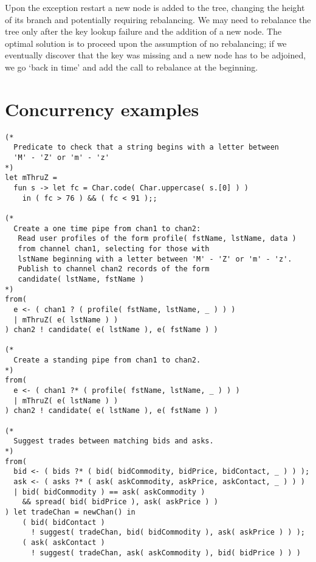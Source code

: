 \documentclass{article}
\begin{document}
Upon the exception restart a new node is added to the tree, changing the height of its branch and potentially requiring rebalancing. We may need to rebalance the tree only after the key lookup failure and the addition of a new node. The optimal solution is to proceed upon the assumption of no rebalancing; if we eventually discover that the key was missing and a new node has to be adjoined, we go ‘back in time’ and add the call to rebalance at the beginning.

\break
\section{Concurrency examples}
\lstset{language=[Objective]Caml}\begin{lstlisting}
(*
  Predicate to check that a string begins with a letter between
  'M' - 'Z' or 'm' - 'z'
*)
let mThruZ =
  fun s -> let fc = Char.code( Char.uppercase( s.[0] ) )
    in ( fc > 76 ) && ( fc < 91 );;

(*
  Create a one time pipe from chan1 to chan2:
   Read user profiles of the form profile( fstName, lstName, data )
   from channel chan1, selecting for those with
   lstName beginning with a letter between 'M' - 'Z' or 'm' - 'z'.
   Publish to channel chan2 records of the form
   candidate( lstName, fstName )
*)
from(
  e <- ( chan1 ? ( profile( fstName, lstName, _ ) ) )
  | mThruZ( e( lstName ) )
) chan2 ! candidate( e( lstName ), e( fstName ) )

(*
  Create a standing pipe from chan1 to chan2.
*)
from(
  e <- ( chan1 ?* ( profile( fstName, lstName, _ ) ) )
  | mThruZ( e( lstName ) )
) chan2 ! candidate( e( lstName ), e( fstName ) )

(*
  Suggest trades between matching bids and asks.
*)
from(
  bid <- ( bids ?* ( bid( bidCommodity, bidPrice, bidContact, _ ) ) );
  ask <- ( asks ?* ( ask( askCommodity, askPrice, askContact, _ ) ) )
  | bid( bidCommodity ) == ask( askCommodity )
    && spread( bid( bidPrice ), ask( askPrice ) )
) let tradeChan = newChan() in
    ( bid( bidContact )
      ! suggest( tradeChan, bid( bidCommodity ), ask( askPrice ) ) );
    ( ask( askContact )
      ! suggest( tradeChan, ask( askCommodity ), bid( bidPrice ) ) )
\end{lstlisting}
\end{document}
